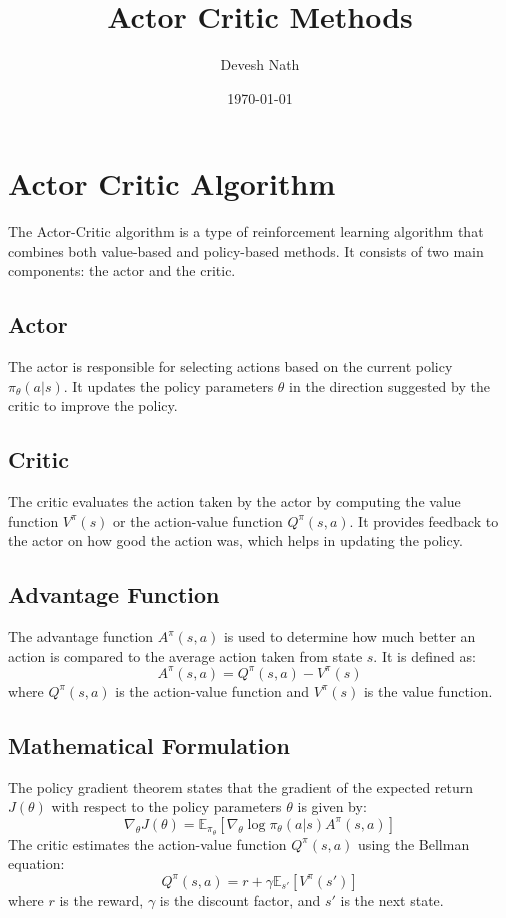 \documentclass[12pt]{article}
\begin{document}
\title{Actor Critic Methods}
\author{Devesh Nath}
\date{\today}

\maketitle

\section{Actor Critic Algorithm}

The Actor-Critic algorithm is a type of reinforcement learning algorithm that combines both value-based and policy-based methods. It consists of two main components: the actor and the critic.

\subsection{Actor}
The actor is responsible for selecting actions based on the current policy $\pi_\theta(a|s)$. It updates the policy parameters $\theta$ in the direction suggested by the critic to improve the policy.

\subsection{Critic}
The critic evaluates the action taken by the actor by computing the value function $V^\pi(s)$ or the action-value function $Q^\pi(s, a)$. It provides feedback to the actor on how good the action was, which helps in updating the policy.

\subsection{Advantage Function}
The advantage function $A^\pi(s, a)$ is used to determine how much better an action is compared to the average action taken from state $s$. It is defined as:
\[
A^\pi(s, a) = Q^\pi(s, a) - V^\pi(s)
\]
where $Q^\pi(s, a)$ is the action-value function and $V^\pi(s)$ is the value function.

\subsection{Mathematical Formulation}
The policy gradient theorem states that the gradient of the expected return $J(\theta)$ with respect to the policy parameters $\theta$ is given by:
\[
\nabla_\theta J(\theta) = \mathbb{E}_{\pi_\theta} \left[ \nabla_\theta \log \pi_\theta(a|s) A^\pi(s, a) \right]
\]
The critic estimates the action-value function $Q^\pi(s, a)$ using the Bellman equation:
\[
Q^\pi(s, a) = r + \gamma \mathbb{E}_{s'} \left[ V^\pi(s') \right]
\]
where $r$ is the reward, $\gamma$ is the discount factor, and $s'$ is the next state.
\end{document}
